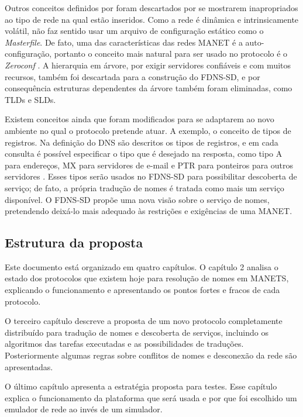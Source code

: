 Outros conceitos definidos por \cite{rfc1035} foram descartados por se mostrarem
inapropriados ao tipo de rede na qual estão inseridos. Como a rede é dinâmica e
intrinsicamente volátil, não faz sentido usar um arquivo de configuração estático
como o \textit{Masterfile}. De fato, uma das características das redes MANET é a
auto-configuração, portanto o conceito mais natural para ser usado no protocolo
é o \textit{Zeroconf} \cite{zeroconf}. A hierarquia em árvore, por exigir servidores
confiáveis e com muitos recursos, também foi descartada para a construção do
FDNS-SD, e por consequência estruturas dependentes da árvore também foram eliminadas,
como TLDs e SLDs.

Existem conceitos ainda que foram modificados para se adaptarem ao novo ambiente
no qual o protocolo pretende atuar. A exemplo, o conceito de tipos de registros.
Na definição do DNS são descritos os tipos de registros, e em cada consulta é
possível especificar o tipo que é desejado na resposta, como tipo A para endereços,
MX para servidores de e-mail e PTR para ponteiros para outros servidores \cite{rfc1035}.
Esses tipos serão usados no FDNS-SD para possibilitar descoberta de serviço; de
fato, a própria tradução de nomes é tratada como mais um serviço disponível. O
FDNS-SD propõe uma nova visão sobre o serviço de nomes, pretendendo deixá-lo mais
adequado às restrições e exigências de uma MANET.

\subsection{Estrutura da proposta}

Este documento está organizado em quatro capítulos. O capítulo 2 analisa o estado
dos protocolos que existem hoje para resolução de nomes em MANETS, explicando o
funcionamento e apresentando os pontos fortes e fracos de cada protocolo.

O terceiro capítulo descreve a proposta de um novo protocolo completamente
distribuído para tradução de nomes e descoberta de serviços, incluindo os
algoritmos das tarefas executadas e as possibilidades de traduções. Posteriormente
algumas regras sobre conflitos de nomes e desconexão da rede são apresentadas.

O último capítulo apresenta a estratégia proposta para testes. Esse capítulo
explica o funcionamento da plataforma que será usada e por que foi escolhido um
emulador de rede ao invés de um simulador.